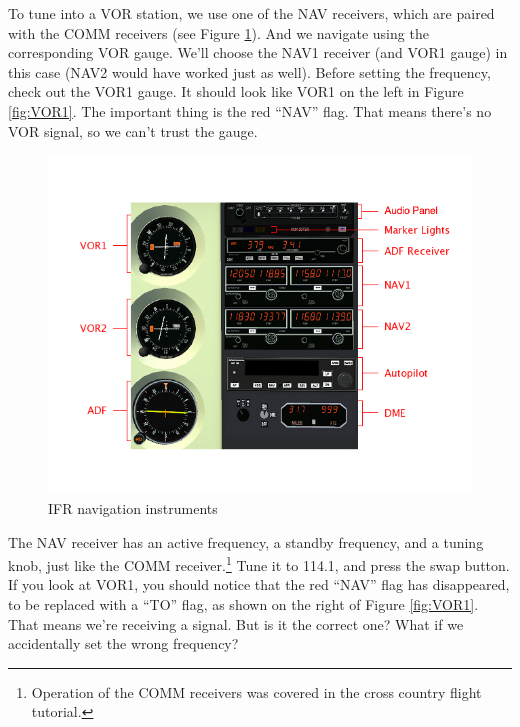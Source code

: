 
To tune into a VOR station, we use one of the NAV receivers, which are
paired with the COMM receivers (see Figure \ref{fig:panel}).  And we
navigate using the corresponding VOR gauge.  We'll choose the NAV1
receiver (and VOR1 gauge) in this case (NAV2 would have worked just as
well).  Before setting the frequency, check out the VOR1 gauge.  It
should look like VOR1 on the left in Figure \ref{fig:VOR1}.  The
important thing is the red ``NAV'' flag.  That means there's no VOR
signal, so we can't trust the gauge.

\begin{figure}
  \begin{center}
    \includegraphics[width=12cm]{img/panel_labelled}
    \caption{IFR navigation instruments}
    \label{fig:panel}
  \end{center}
\end{figure}

The NAV receiver has an active frequency, a standby frequency, and a
tuning knob, just like the COMM receiver.\footnote{Operation of the
  COMM receivers was covered in the cross country flight tutorial.}
Tune it to 114.1, and press the swap button.  If you look at VOR1, you should notice that the red ``NAV''
flag has disappeared, to be replaced with a ``TO'' flag, as shown on
the right of Figure \ref{fig:VOR1}.  That means we're receiving a
signal.  But is it the correct one?  What if we accidentally set the
wrong frequency?

